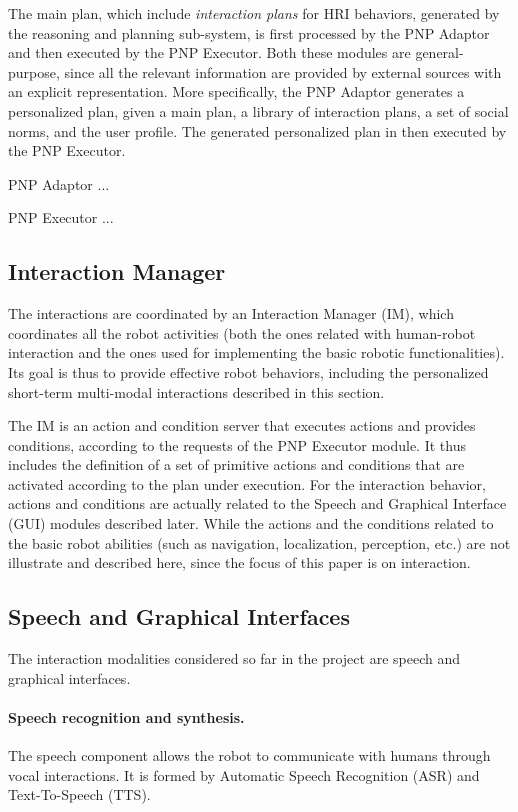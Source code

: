 The main plan, which include \emph{interaction plans} for HRI behaviors, generated by the reasoning and planning sub-system, is first processed by the PNP Adaptor and then executed by the PNP Executor. Both these modules are general-purpose, since all the relevant information are provided by external sources with an explicit representation. More specifically, the PNP Adaptor generates a personalized plan, given a main plan, a library of interaction plans, a set of social norms, and the user profile.
The generated personalized plan in then executed by the PNP Executor.

PNP Adaptor ...



PNP Executor ...




\subsection{Interaction Manager}

The interactions are coordinated by an Interaction Manager (IM), which coordinates all the robot activities (both the ones related with human-robot interaction and the ones used for implementing the basic robotic functionalities).
Its goal is thus to provide effective robot behaviors, including the personalized short-term multi-modal interactions described in this section.

The IM is an action and condition server that executes actions and provides conditions, according to the requests of the PNP Executor module. It thus includes the definition of a set of primitive actions and conditions that are activated according to the plan under execution.
For the interaction behavior, actions and conditions are actually related to the Speech and Graphical Interface (GUI) modules described later. While the actions and the conditions related to the basic robot abilities (such as navigation, localization, perception, etc.) are not illustrate and described here, since the focus of this paper is on interaction.


\subsection{Speech and Graphical Interfaces}

The interaction modalities considered so far in the project are speech and graphical interfaces.


\paragraph{Speech recognition and synthesis.}
The speech component allows the robot to communicate with humans through vocal interactions. 
It is formed by Automatic Speech Recognition (ASR) and Text-To-Speech (TTS).

